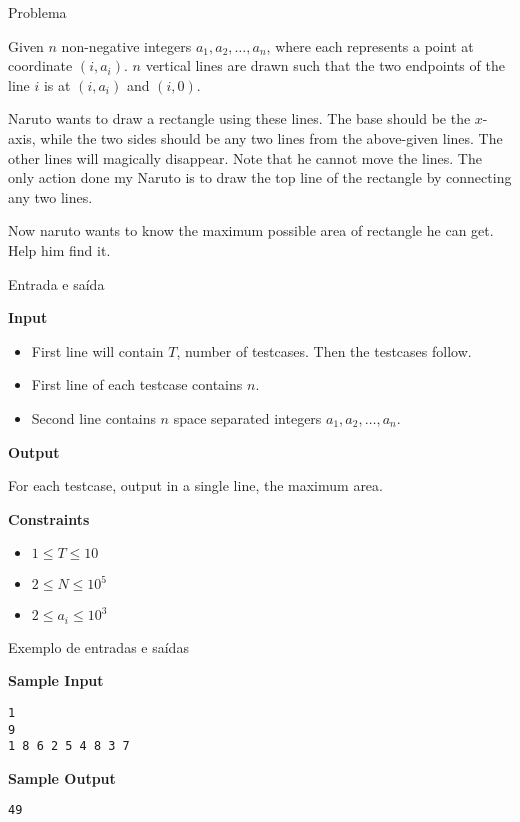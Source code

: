 
\begin{frame}[fragile]{Problema}

Given $n$ non-negative integers $a_1, a_2, \ldots, a_n$, where each represents a point at 
coordinate $(i, a_i)$. $n$ vertical lines are drawn such that the two endpoints of the line $i$ is
at $(i, a_i)$ and $(i, 0)$.

Naruto wants to draw a rectangle using these lines. The base should be the $x$-axis, while the 
two sides should be any two lines from the above-given lines. The other lines will magically 
disappear. Note that he cannot move the lines. The only action done my Naruto is to draw the top 
line of the rectangle by connecting any two lines.

Now naruto wants to know the maximum possible area of rectangle he can get. Help him find it.
\end{frame}

\begin{frame}[fragile]{Entrada e saída}

\textbf{Input}

\begin{itemize}
    \item First line will contain $T$, number of testcases. Then the testcases follow.
    \item First line of each testcase contains $n$.
    \item Second line contains $n$ space separated integers $a_1, a_2, \ldots, a_n$.
\end{itemize}

\textbf{Output}

For each testcase, output in a single line, the maximum area.

\textbf{Constraints}

\begin{itemize}
    \item $1 \leq T \leq 10$
    \item $2 \leq N \leq 10^5$
    \item $2 \leq a_i \leq 10^3$
\end{itemize}

\end{frame}

\begin{frame}[fragile]{Exemplo de entradas e saídas}

\begin{minipage}[t]{0.5\textwidth}
\textbf{Sample Input}
\begin{verbatim}
1
9
1 8 6 2 5 4 8 3 7
\end{verbatim}
\end{minipage}
\begin{minipage}[t]{0.45\textwidth}
\textbf{Sample Output}
\begin{verbatim}
49
\end{verbatim}
\end{minipage}
\end{frame}

